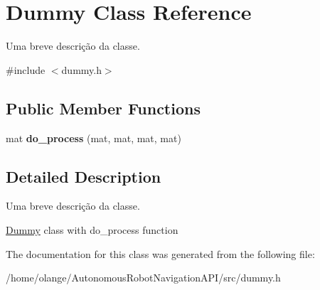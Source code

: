 \hypertarget{class_dummy}{}\section{Dummy Class Reference}
\label{class_dummy}


Uma breve descrição da classe.  




{\ttfamily \#include $<$dummy.\+h$>$}

\subsection*{Public Member Functions}
\begin{DoxyCompactItemize}
\item 
\mbox{\label{class_dummy_ab48493a3ecc0e87d24d21bb35381628a}} 
mat {\bfseries do\+\_\+process} (mat, mat, mat, mat)
\end{DoxyCompactItemize}


\subsection{Detailed Description}
Uma breve descrição da classe. 

\hyperlink{class_dummy}{Dummy} class with do\+\_\+process function 

The documentation for this class was generated from the following file\+:\begin{DoxyCompactItemize}
\item 
/home/olange/\+Autonomous\+Robot\+Navigation\+A\+P\+I/src/dummy.\+h\end{DoxyCompactItemize}
